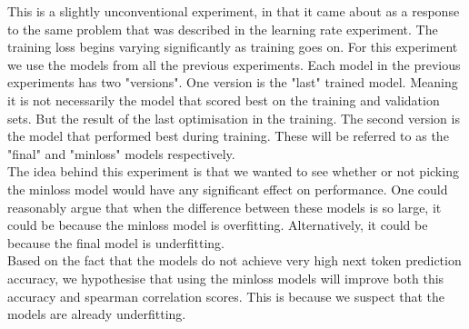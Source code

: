 This is a slightly unconventional experiment, in that it came about as a response to the same problem that was described in the learning rate experiment. The training loss begins varying significantly as training goes on. For this experiment we use the models from all the previous experiments. Each model in the previous experiments has two "versions". One version is the "last" trained model. Meaning it is not necessarily the model that scored best on the training and validation sets. But the result of the last optimisation in the training. The second version is the model that performed best during training. These will be referred to as the "final" and "minloss" models respectively.\\

\noindent
The idea behind this experiment is that we wanted to see whether or not picking the minloss model would have any significant effect on performance. One could reasonably argue that when the difference between these models is so large, it could be because the minloss model is overfitting. Alternatively, it could be because the final model is underfitting.\\

\noindent
Based on the fact that the models do not achieve very high next token prediction accuracy, we hypothesise that using the minloss models will improve both this accuracy and spearman correlation scores. This is because we suspect that the models are already underfitting.